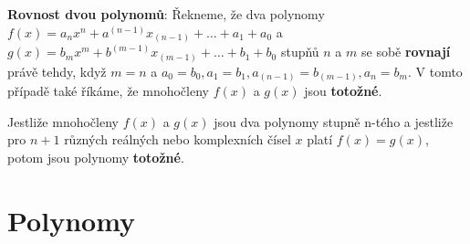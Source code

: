       \begin{definition}\label{def_rov_poly}\textbf{Rovnost dvou polynomů}:
        Řekneme, že dva polynomy \newline$f(x)=a_nx^n+a^{(n-1)}x_{(n-1)}+\ldots+a_1+a_0$ a
        $g(x)=b_mx^m+b^{(m-1)}x_{(m-1)}+\ldots+b_1+b_0$ stupňů $n$ a $m$ se sobě \textbf{rovnají}
        právě tehdy, když $m=n$ a $a_0=b_0, a_1=b_1, a_{(n-1)}=b_{(m-1)}, a_n=b_m$. V tomto případě
        také říkáme, že mnohočleny $f(x)$ a $g(x)$ jsou \textbf{totožné}.
      \end{definition}
      \begin{lemma}\label{la:eq_eqv_poly}
        Jestliže mnohočleny $f(x)$ a $g(x)$ jsou dva polynomy stupně n-tého a jestliže pro $n+1$
        různých reálných nebo komplexních čísel $x$ platí $f(x)=g(x)$, potom jsou polynomy
        \textbf{totožné}.
      \end{lemma}
  
  \section{Polynomy}
